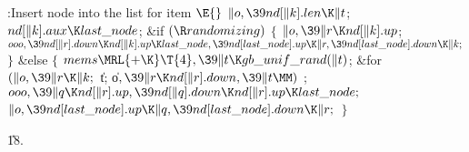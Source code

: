 \Y\B\4:Insert node  into the list for item \X${}%
\E{}$\6
$\|o,\39\\{nd}[\|k].\\{len}\K\|t{}$;\6
${}\\{nd}[\|k].\\{aux}\K\\{last\_node}{}$;\6
\&{if} ${}(\R\\{randomizing}){}$\5
${}\{{}$\1\6
${}\|o,\39\|r\K\\{nd}[\|k].\\{up}{}$;%
\6
${}\\{ooo},\39\\{nd}[\|r].\\{down}\K\\{nd}[\|k].\\{up}\K\\{last\_node},\39%
\\{nd}[\\{last\_node}].\\{up}\K\|r,\39\\{nd}[\\{last\_node}].\\{down}\K\|k;{}$\6
\4${}\}{}$\5
\2\&{else}\5
${}\{{}$\1\6
${}\\{mems}\MRL{+{\K}}\T{4},\39\|t\K\\{gb\_unif\_rand}(\|t){}$;\6
\&{for} ${}(\|o,\39\|r\K\|k;{}$ \|t; \|o${},\39\|r\K\\{nd}[\|r].\\{down},\39\|t%
\MM){}$\1\5
;\2\6
${}\\{ooo},\39\|q\K\\{nd}[\|r].\\{up},\39\\{nd}[\|q].\\{down}\K\\{nd}[\|r].%
\\{up}\K\\{last\_node};{}$\6
${}\|o,\39\\{nd}[\\{last\_node}].\\{up}\K\|q,\39\\{nd}[\\{last\_node}].\\{down}%
\K\|r;{}$\6
\4${}\}{}$\2\par
\U18.\fi

